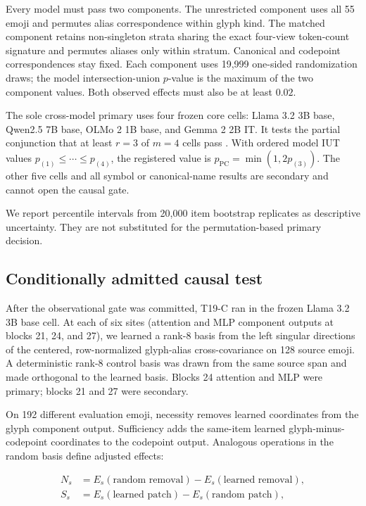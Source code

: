 \documentclass{article}
\begin{document}
Every model must pass two components. The unrestricted component uses all 55
emoji and permutes alias correspondence within glyph kind. The matched
component retains non-singleton strata sharing the exact four-view
token-count signature and permutes aliases only within stratum. Canonical and
codepoint correspondences stay fixed. Each component uses 19,999 one-sided
randomization draws; the model intersection-union $p$-value is the maximum of
the two component values. Both observed effects must also be at least $0.02$.

The sole cross-model primary uses four frozen core cells: Llama 3.2 3B base,
Qwen2.5 7B base, OLMo 2 1B base, and Gemma 2 2B IT. It tests the partial
conjunction that at least $r=3$ of $m=4$ cells pass
\citep{benjamini2008partial}. With ordered model IUT values
$p_{(1)}\leq\cdots\leq p_{(4)}$, the registered value is
$p_{\mathrm{PC}}=\min(1,2p_{(3)})$. The other five cells and all symbol or
canonical-name results are secondary and cannot open the causal gate.

We report percentile intervals from 20,000 item bootstrap replicates as
descriptive uncertainty. They are not substituted for the permutation-based
primary decision.

\subsection{Conditionally admitted causal test}

After the observational gate was committed, T19-C ran in the frozen Llama 3.2
3B base cell. At each of six sites (attention and MLP component outputs at
blocks 21, 24, and 27), we learned a rank-8 basis from the left singular
directions of the centered, row-normalized glyph-alias cross-covariance on 128
source emoji. A deterministic rank-8 control basis was drawn from the same
source span and made orthogonal to the learned basis. Blocks 24 attention and
MLP were primary; blocks 21 and 27 were secondary.

On 192 different evaluation emoji, necessity removes learned coordinates from
the glyph component output. Sufficiency adds the same-item learned
glyph-minus-codepoint coordinates to the codepoint output. Analogous operations
in the random basis define adjusted effects:

\begin{align}
N_s &= E_s(\text{random removal})-E_s(\text{learned removal}),\\
S_s &= E_s(\text{learned patch})-E_s(\text{random patch}),
\end{align}
\end{document}
